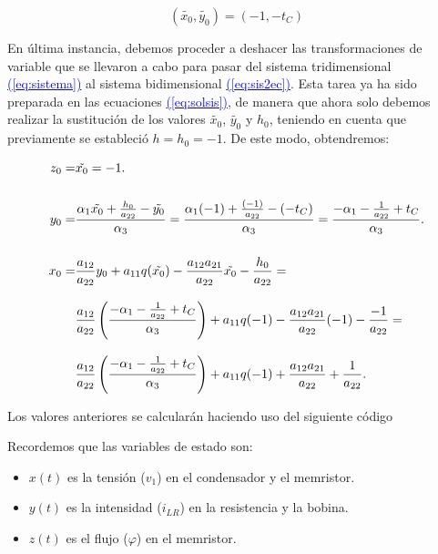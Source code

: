\documentclass[12pt,a4paper]{report} %
\newcommand{\eref}[1]{\hyperref[#1]{\textcolor{blue}{(\ref*{#1})}}}
\newcommand{\eref}[1]{\hyperref[#1]{\textcolor{blue}{\textit{(\ref*{#1})}}}}
\begin{document}
	\begin{equation}
		\label{eq:desh2}
		(\tilde{x_0},\tilde{y_0}) = (-1,-t_C)
	\end{equation}\smallskip
	
	En última instancia, debemos proceder a deshacer las transformaciones de variable que se llevaron a cabo para pasar del sistema tridimensional \eref{eq:sistema} al sistema bidimensional \eref{eq:sis2ec}. Esta tarea ya ha sido preparada en las ecuaciones \eref{eq:solsis}, de manera que ahora solo debemos realizar la sustitución de los valores $\tilde{x_0}$, $\tilde{y_0}$ y $h_0$, teniendo en cuenta que previamente se estableció $h = h_0=-1$. De este modo, obtendremos:
	
\begin{subequations}
	\label{eq:deshh}
	\begin{align}
		z_0=&\tilde{x_0}=-1. \label{eq:desh3} \\[5mm]
		y_0=& \frac{\alpha_1\tilde{x_0}+\frac{h_0}{a_{22}}-\tilde{y_0}}{\alpha_3} = \frac{\alpha_1(-1)+\frac{(-1)}{a_{22}}-(-t_C)}{\alpha_3} = \frac{-\alpha_1-\frac{1}{a_{22}}+t_C}{\alpha_3} \label{eq:desh4}. \\[5mm]
		x_0= &\frac{a_{12}}{a_{22}}y_0+a_{11}q(\tilde{x_0})-\frac{a_{12}a_{21}}{a_{22}}\tilde{x_0}-\frac{h_0}{a_{22}}=\notag\\[3mm] &\frac{a_{12}}{a_{22}}  \left( \frac{-\alpha_1-\frac{1}{a_{22}}+t_C}{\alpha_3} \right)+a_{11}q(-1)-\frac{a_{12}a_{21}}{a_{22}}(-1)-\frac{-1}{a_{22}}=\notag\\[3mm]
		&\frac{a_{12}}{a_{22}}  \left( \frac{-\alpha_1-\frac{1}{a_{22}}+t_C}{\alpha_3} \right)+a_{11}q(-1)+\frac{a_{12}a_{21}}{a_{22}}+\frac{1}{a_{22}}. \label{eq:desh5}
	\end{align}
\end{subequations}

\newpage

	\noindent Los valores anteriores se calcularán haciendo uso del siguiente código
	
	\vspace{0.5cm}
	
	\vspace{1cm}
	
	\newpage
	
	\noindent Recordemos que las variables de estado son:
	\begin{itemize}
		\item $x(t)$ es la tensión ($v_1$) en el condensador y el memristor.
		\item $y(t)$ es la intensidad ($i_{LR}$) en la resistencia y la bobina.
		\item $z(t)$ es el flujo ($\varphi$) en el memristor.
	\end{itemize}
	
\end{document}
